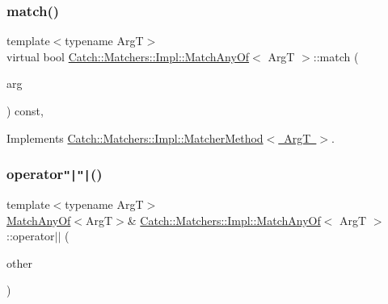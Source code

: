 \subsubsection{\texorpdfstring{match()}{match()}}
{\footnotesize\ttfamily template$<$typename ArgT$>$ \\
virtual bool \mbox{\hyperlink{struct_catch_1_1_matchers_1_1_impl_1_1_match_any_of}{Catch\+::\+Matchers\+::\+Impl\+::\+Match\+Any\+Of}}$<$ ArgT $>$\+::match (\begin{DoxyParamCaption}\item[{ArgT const \&}]{arg }\end{DoxyParamCaption}) const\hspace{0.3cm}{\ttfamily [inline]}, {\ttfamily [virtual]}}



Implements \mbox{\hyperlink{struct_catch_1_1_matchers_1_1_impl_1_1_matcher_method_ae0920ff9e817acf08e1bb0cbcb044e30}{Catch\+::\+Matchers\+::\+Impl\+::\+Matcher\+Method$<$ Arg\+T $>$}}.

\mbox{\label{struct_catch_1_1_matchers_1_1_impl_1_1_match_any_of_a44d7582dbe09fc31b9a5ba8a6367b506}} 
\subsubsection{\texorpdfstring{operator\texttt{"|}\texttt{"|}()}{operator||()}}
{\footnotesize\ttfamily template$<$typename ArgT$>$ \\
\mbox{\hyperlink{struct_catch_1_1_matchers_1_1_impl_1_1_match_any_of}{Match\+Any\+Of}}$<$ArgT$>$\& \mbox{\hyperlink{struct_catch_1_1_matchers_1_1_impl_1_1_match_any_of}{Catch\+::\+Matchers\+::\+Impl\+::\+Match\+Any\+Of}}$<$ ArgT $>$\+::operator$\vert$$\vert$ (\begin{DoxyParamCaption}\item[{\mbox{\hyperlink{struct_catch_1_1_matchers_1_1_impl_1_1_matcher_base}{Matcher\+Base}}$<$ ArgT $>$ const \&}]{other }\end{DoxyParamCaption})\hspace{0.3cm}{\ttfamily [inline]}}



